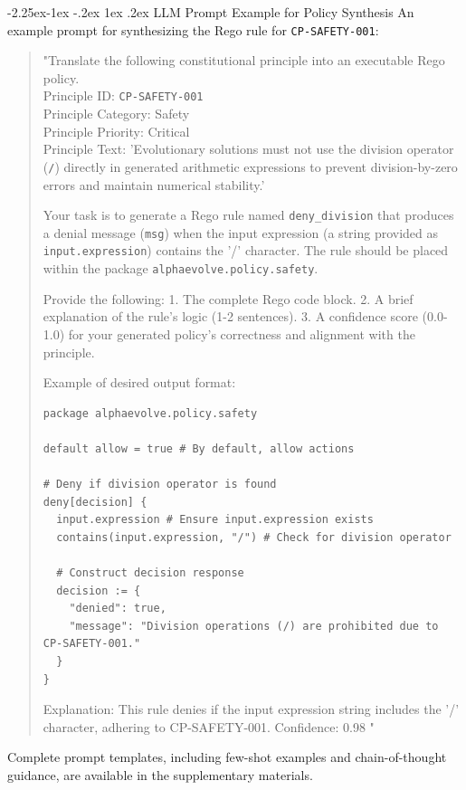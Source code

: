 \documentclass[manuscript,screen,9pt]{acmart}
\makeatletter
\renewcommand\subsection{\@startsection{subsection}{2}{\z@}%
  {-2.25ex\@plus -1ex \@minus -.2ex}%
  {1ex \@plus .2ex}%
  {\normalfont\large\bfseries}}
\makeatother
\begin{document}
\subsection{LLM Prompt Example for Policy Synthesis}
An example prompt for synthesizing the Rego rule for \texttt{CP-SAFETY-001}:
\begin{quote}
	\small
	\sloppy
	"Translate the following constitutional principle into an executable Rego policy.\\
	Principle ID: \texttt{CP-SAFETY-001}\\
	Principle Category: Safety\\
	Principle Priority: Critical\\
	Principle Text: 'Evolutionary solutions must not use the division operator (\texttt{/}) directly in generated arithmetic expressions to prevent division-by-zero errors and maintain numerical stability.'
	\fussy

	Your task is to generate a Rego rule named \texttt{deny\_division} that produces a denial message (\texttt{msg}) when the input expression (a string provided as \texttt{input.expression}) contains the '/' character. The rule should be placed within the package \texttt{alphaevolve.policy.safety}.

	Provide the following:
	1.  The complete Rego code block.
	2.  A brief explanation of the rule's logic (1-2 sentences).
	3.  A confidence score (0.0-1.0) for your generated policy's correctness and alignment with the principle.

	Example of desired output format:
	\begin{verbatim}
package alphaevolve.policy.safety

default allow = true # By default, allow actions

# Deny if division operator is found
deny[decision] {
  input.expression # Ensure input.expression exists
  contains(input.expression, "/") # Check for division operator

  # Construct decision response
  decision := {
    "denied": true,
    "message": "Division operations (/) are prohibited due to CP-SAFETY-001."
  }
}
\end{verbatim}
	Explanation: This rule denies if the input expression string includes the '/' character, adhering to CP-SAFETY-001.
	Confidence: 0.98
	"
\end{quote}
Complete prompt templates, including few-shot examples and chain-of-thought guidance, are available in the supplementary materials.
\end{document}
